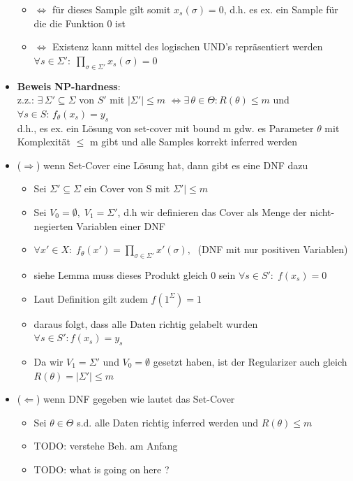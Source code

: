 \documentclass[12pt,a4paper]{article}
\begin{document}
\begin{itemize}
\begin{itemize}
\item $\Leftrightarrow$ für dieses Sample gilt somit $x_s(\sigma) = 0$, d.h. es ex. ein Sample für die die Funktion 0 ist
\item $\Leftrightarrow$ Existenz kann mittel des logischen UND's repräsentiert werden\\
$\displaystyle \forall s\in\Sigma':\; \prod_{\sigma\in\Sigma'}x_s(\sigma)=0$
\end{itemize}
\item \textbf{Beweis NP-hardness}:\\
z.z.: $\exists\, \Sigma' \subseteq \Sigma$ von $S'$ mit $|\Sigma'|\leq m$ $\Leftrightarrow \exists\, \theta\in\Theta: R(\theta) \leq m$ und\\
$\forall s \in S: \, f_\theta(x_s)=y_s$\\
d.h., es ex. ein Lösung von set-cover mit bound m gdw. es Parameter $\theta$ mit Komplexität $\leq$ m gibt und alle Samples korrekt inferred werden

\item ($\Rightarrow$) wenn Set-Cover eine Lösung hat, dann gibt es eine DNF dazu
\begin{itemize}
\item Sei $\Sigma' \subseteq \Sigma$ ein Cover von S mit $\Sigma'|\leq m$
\item Sei $V_0 = \emptyset, \; V_1=\Sigma'$, d.h wir definieren das Cover als Menge der nicht-negierten Variablen einer DNF
\item $\displaystyle \forall x' \in X:\; f_\theta(x')=\prod_{\sigma\in\Sigma'} x'(\sigma),\;$ (DNF mit nur positiven Variablen)
\item siehe Lemma muss dieses Produkt gleich 0 sein $\forall s \in S':\;f(x_s)=0$
\item Laut Definition gilt zudem $f(1^\Sigma)=1$
\item daraus folgt, dass alle Daten richtig gelabelt wurden\\ $\forall s\in S': f(x_s)=y_s$
\item Da wir $V_1 = \Sigma'$ und $V_0 = \emptyset$ gesetzt haben, ist der Regularizer auch gleich $R(\theta)= |\Sigma'| \leq m$
\end{itemize}
\item ($\Leftarrow$) wenn DNF gegeben wie lautet das Set-Cover
\begin{itemize}
\item Sei $\theta \in \Theta$ s.d. alle Daten richtig inferred werden und $R(\theta) \leq m$
\item TODO: verstehe Beh. am Anfang
\item TODO: what is going on here ?
\end{itemize}
\end{itemize}
\end{document}
